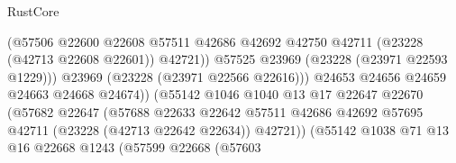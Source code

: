 \begin{lexlean}{RustCore}
\begin{coremodule}
                                                (@57506
                                                  @22600
                                                  @22608
                                                  @57511
                                                  @42686
                                                  @42692
                                                  @42750
                                                  @42711
                                                  (@23228 (@42713 @22608 @22601))
                                                  @42721))
                                              @57525
                                              @23969
                                              (@23228 (@23971 @22593 @1229)))
                                            @23969
                                            (@23228 (@23971 @22566 @22616)))
                                          @24653
                                          @24656
                                          @24659
                                          @24663
                                          @24668
                                          @24674))
                                      (@55142
                                        @1046
                                        @1040
                                        @13
                                        @17
                                        @22647
                                        @22670
                                        (@57682
                                          @22647
                                          (@57688
                                            @22633
                                            @22642
                                            @57511
                                            @42686
                                            @42692
                                            @57695
                                            @42711
                                            (@23228 (@42713 @22642 @22634))
                                            @42721))
                                        (@55142
                                          @1038
                                          @71
                                          @13
                                          @16
                                          @22668
                                          @1243
                                          (@57599
                                            @22668
                                            (@57603

\end{coremodule}
\end{lexlean}
